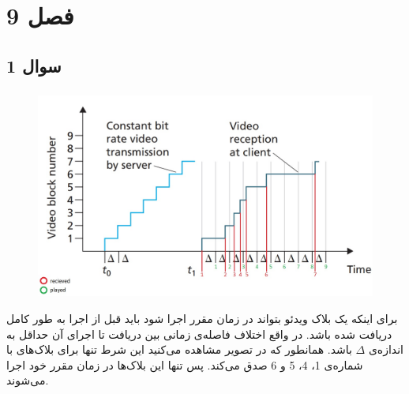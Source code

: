 \documentclass{article}
\begin{document}


\newpage

\section{فصل 9}
\subsection{سوال 1}
\subsubsection{}
\begin{figure}[H]
    \centering
    \includegraphics[width=1.0\textwidth]{figures/1a.jpg}
    \caption
	{}
    \label{fig:fig1}
\end{figure}
برای اینکه یک بلاک ویدئو بتواند در زمان مقرر اجرا شود باید قبل از اجرا به طور کامل دریافت شده باشد. در واقع اختلاف فاصله‌ی زمانی بین دریافت تا اجرای آن حداقل به اندازه‌ی $\Delta$ باشد. همانطور که در تصویر مشاهده می‌کنید این شرط تنها برای بلاک‌های با شماره‌ی 1، 4، 5 و 6 صدق می‌کند. پس تنها این بلاک‌ها در زمان مقرر خود اجرا می‌شوند.
\end{document}
